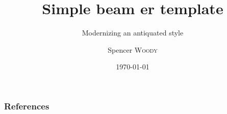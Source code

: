 




\title[Beamer template]{Simple beam er template}
\subtitle{Modernizing an antiquated style}


\author{Spencer \textsc{Woody}}






\date{\today} 
















\begin{frame}[t,allowframebreaks]
\frametitle{References}

\footnotesize
\begingroup
\renewcommand{\section}[2]{}

\endgroup
\normalsize

\end{frame}




